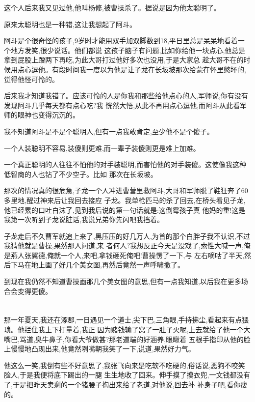 ﻿\documentclass[12pt,twocolumn]{article}
\begin{document}
这个人后来我又见过他,他叫杨修,被曹操杀了。据说是因为他太聪明了。

原来太聪明也是一种错,这让我想起了阿斗。

阿斗是个很奇怪的孩子,9岁时才能用双手加双脚数到18,平日里总是呆呆地看着一个地方发笑,很少说话。他们都说
这孩子脑子有问题,比如你给他一块点心,他总是拿到屁股上蹭两下再吃,为此大哥打过他好多次也没用,于是大家总
趁大哥不在的时候用点心逗他。有段时间我一度以为他是让子龙在长坂坡那次给蒙在怀里憋坏的,觉得他怪可怜的。

后来我才知道我错了。应该可怜的人是你我和那些给他点心的人,军师说,你有没有发现阿斗几乎每天都有点心吃?我
恍然大悟,从此不再用点心逗他,而阿斗从此看军师的眼神也变得沉沉的。

我不知道阿斗是不是个聪明人,但有一点我敢肯定,至少他不是个傻子。

一个人装聪明不容易,装傻则更难,而一辈子装傻则更是难上加难。

一个真正聪明的人往往不怕他的对手装聪明,而害怕他的对手装傻。这使像我这种低智商的人也钻了不少空子。比如
那次在长坂坡。

那次的情况真的很危急,子龙一个人冲进曹营里救阿斗,大哥和军师脱了鞋狂奔了60多里地,醒过神来后让我回去接应
子龙。我单枪匹马的杀了回去,在桥头看见子龙,他已经累的口吐白沫了,见到我后说的第一句话就是:这倒霉孩子真
他妈的重!这是我第一次听到子龙说脏话,我说兄弟你先闪吧我挡着。

子龙走后不久曹军就追上来了,黑压压的好几万人,为首的那个白胖子我不认识,不过我猜他就是曹操,果然那人问道,来
者何人?我想反正今天是没戏了,索性大喊一声,俺是燕人张翼德,俺就一个人,来吧,拿钱砸死俺吧!曹操愣了一下,与
左右嘀咕了半天,然后下马在地上画了好几个美女图,再然后竟然一声呼啸撤了。

到现在我仍然不知道曹操画那几个美女图的意思,但有一点我知道,以后我在更多场合会变得更傻。

\section{}

那一年夏天,我还在涿郡,一日遇见一个道士,尖下巴,三角眼,手持拂尘,看起来有点猥琐。他拦住我上下打量着,我正
因为赌钱输了窝了一肚子火呢,上去就给了他一个大嘴巴,骂道,臭牛鼻子,你看大爷做甚?那老道端的好涵养,眼瞅着
五根手指印从他的脸上慢慢地凸现出来,他竟然咧嘴朝我笑了一下,说道,果然好力气。

他这么一笑,我倒有些不好意思了,我张飞向来是吃软不吃硬的,俗话说,恶狗不咬笑脸人,于是我便将底下踢出的一腿
生生地收了回来。伸手摸了摸衣兜,一文钱都没有了,于是把昨天卖剩的一个猪腰子掏出来给了老道,对他说,回去补
补身子吧,看你瘦的。
\end{document}
